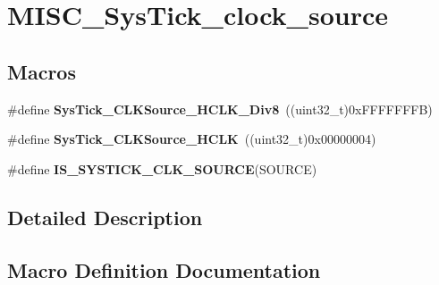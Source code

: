 \hypertarget{group___m_i_s_c___sys_tick__clock__source}{}\section{M\+I\+S\+C\+\_\+\+Sys\+Tick\+\_\+clock\+\_\+source}
\label{group___m_i_s_c___sys_tick__clock__source}
\subsection*{Macros}
\begin{DoxyCompactItemize}
\item 
\hypertarget{group___m_i_s_c___sys_tick__clock__source_ga545c387ce43db90f15faad5f354f890d}{}\#define {\bfseries Sys\+Tick\+\_\+\+C\+L\+K\+Source\+\_\+\+H\+C\+L\+K\+\_\+\+Div8}~((uint32\+\_\+t)0x\+F\+F\+F\+F\+F\+F\+F\+B)\label{group___m_i_s_c___sys_tick__clock__source_ga545c387ce43db90f15faad5f354f890d}

\item 
\hypertarget{group___m_i_s_c___sys_tick__clock__source_ga8a885ce2632ad4c35e229bb7c6e60191}{}\#define {\bfseries Sys\+Tick\+\_\+\+C\+L\+K\+Source\+\_\+\+H\+C\+L\+K}~((uint32\+\_\+t)0x00000004)\label{group___m_i_s_c___sys_tick__clock__source_ga8a885ce2632ad4c35e229bb7c6e60191}

\item 
\#define {\bfseries I\+S\+\_\+\+S\+Y\+S\+T\+I\+C\+K\+\_\+\+C\+L\+K\+\_\+\+S\+O\+U\+R\+C\+E}(S\+O\+U\+R\+C\+E)
\end{DoxyCompactItemize}


\subsection{Detailed Description}


\subsection{Macro Definition Documentation}
\hypertarget{group___m_i_s_c___sys_tick__clock__source_ga22d6291f6aed29442cf4cd9098fa0784}{}
